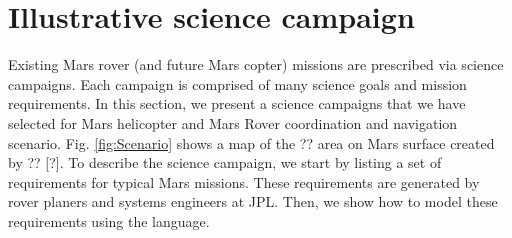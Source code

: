 \documentclass[conference]{IEEEtran}
\begin{document}
	
	\section{Illustrative science campaign}
	Existing Mars rover (and future Mars copter) missions are prescribed via science campaigns. Each campaign is comprised of many science goals and mission requirements. In this section, we present a science campaigns that we have selected for Mars helicopter and Mars Rover coordination and navigation scenario. Fig. \ref{fig:Scenario} shows a map of the ?? area on Mars surface created by ?? [?]. To describe the science campaign, we start by listing a set of requirements for typical Mars missions. These requirements are generated by rover planers and systems engineers at JPL. Then, we show how to model these requirements using the \DTL language.
    
\end{document}
